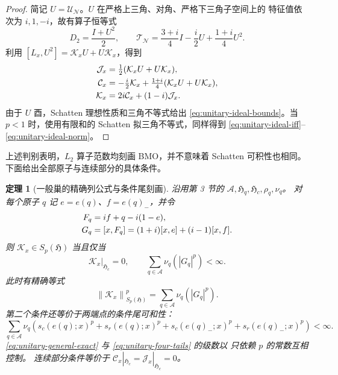 \documentclass[UTF8,11pt,a4paper,fontset=fandol]{ctexart}
\newtheorem{theorem}{定理}[section]
\theoremstyle{remark}
\numberwithin{equation}{section}
\newcommand{\N}{\mathcal N}
\newcommand{\T}{\mathcal T}
\newcommand{\CC}{\mathcal C}
\newcommand{\HH}{\mathfrak H}
\newcommand{\norm}[1]{\left\lVert #1\right\rVert}
\begin{document}
\begin{proof}
简记 $U=\mathcal U_\N$。$U$ 在严格上三角、对角、严格下三角子空间上的
特征值依次为 $i,1,-i$，故有算子恒等式
\begin{equation}\label{eq:unitary-polynomials}
 D_2=\frac{I+U^2}{2},\qquad
 \T_\N=\frac{3+i}{4}I-\frac i2U+\frac{1+i}{4}U^2.
\end{equation}
利用 $[L_x,U^2]=\mathcal K_xU+U\mathcal K_x$，得到
\begin{align}
 \mathcal J_x&=\tfrac12(\mathcal K_xU+U\mathcal K_x),\notag\\
 \CC_x&=-\tfrac i2\mathcal K_x
       +\tfrac{1+i}{4}(\mathcal K_xU+U\mathcal K_x),\notag\\
 \mathcal K_x&=2i\CC_x+(1-i)\mathcal J_x.
 \label{eq:unitary-comm-identities}
\end{align}
由于 $U$ 酉，Schatten 理想性质和三角不等式给出
\eqref{eq:unitary-ideal-bounds}。当 $p<1$ 时，使用有限和的 Schatten
拟三角不等式，同样得到 \eqref{eq:unitary-ideal-iff}--\eqref{eq:unitary-ideal-norm}。
\end{proof}

上述判别表明，$L_2$ 算子范数均刻画 BMO，并不意味着 Schatten 可积性也相同。
下面给出全部原子与连续部分的具体条件。

\begin{theorem}[一般巢的精确列公式与条件尾刻画]\label{thm:unitary-schatten}
沿用第 3 节的 $\mathscr A,\HH_q,\HH_c,\rho_q,\nu_q$。
对每个原子 $q$ 记 $e=e(q)$、$f=e(q)_-$，并令
\begin{align}
 F_q&=if+q-i(1-e),\notag\\
 G_q&=[x,F_q]=(1+i)[x,e]+(i-1)[x,f].
 \label{eq:unitary-local-G}
\end{align}
则 $\mathcal K_x\in S_p(\HH)$ 当且仅当
\begin{equation}\label{eq:unitary-general-condition}
 \mathcal K_x|_{\HH_c}=0,\qquad
 \sum_{q\in\mathscr A}\nu_q(|G_q|^p)<\infty.
\end{equation}
此时有精确等式
\begin{equation}\label{eq:unitary-general-exact}
 \boxed{\quad
 \norm{\mathcal K_x}_{S_p(\HH)}^p
 =\sum_{q\in\mathscr A}\nu_q(|G_q|^p).
 \quad}
\end{equation}
第二个条件还等价于两端点的条件尾可和性：
\begin{equation}\label{eq:unitary-four-tails}
 \sum_{q\in\mathscr A}\nu_q\!\left(
 s_c(e(q);x)^p+s_r(e(q);x)^p
 +s_c(e(q)_-;x)^p+s_r(e(q)_-;x)^p\right)<\infty.
\end{equation}
\eqref{eq:unitary-general-exact} 与 \eqref{eq:unitary-four-tails} 的级数以
只依赖 $p$ 的常数互相控制。
连续部分条件等价于 $\CC_x|_{\HH_c}=\mathcal J_x|_{\HH_c}=0$。
\end{theorem}
\end{document}

